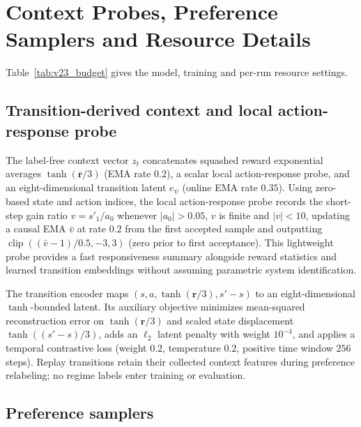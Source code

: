 \section{Context Probes, Preference Samplers and Resource Details}
\label{app:implementation_details}

Table~\ref{tab:v23_budget} gives the model, training and per-run resource settings.

\subsection{Transition-derived context and local action-response probe}

The label-free context vector $z_t$ concatenates squashed reward exponential
averages $\tanh(\overline{\mathbf{r}}/3)$ (EMA rate $0.2$), a scalar local
action-response probe, and an eight-dimensional transition latent $e_\psi$
(online EMA rate $0.35$). Using zero-based state and action indices, the local
action-response probe records the short-step gain ratio $v = s'_1 / a_0$
whenever $|a_0| > 0.05$, $v$ is finite and $|v| < 10$, updating a causal EMA
$\bar{v}$ at rate $0.2$ from the first accepted sample and outputting
$\operatorname{clip}((\bar{v} - 1)/0.5, -3, 3)$ (zero prior to first acceptance).
This lightweight probe provides a fast responsiveness summary alongside reward
statistics and learned transition embeddings without assuming parametric system
identification.

The transition encoder maps $(s, a, \tanh(\mathbf{r}/3), s' - s)$ to an
eight-dimensional $\tanh$-bounded latent. Its auxiliary objective minimizes
mean-squared reconstruction error on $\tanh(\mathbf{r}/3)$ and scaled state
displacement $\tanh((s' - s)/3)$, adds an $\ell_2$ latent penalty with weight
$10^{-4}$, and applies a temporal contrastive loss (weight $0.2$, temperature
$0.2$, positive time window $256$ steps). Replay transitions retain their
collected context features during preference relabeling; no regime labels enter
training or evaluation.

\subsection{Preference samplers}

